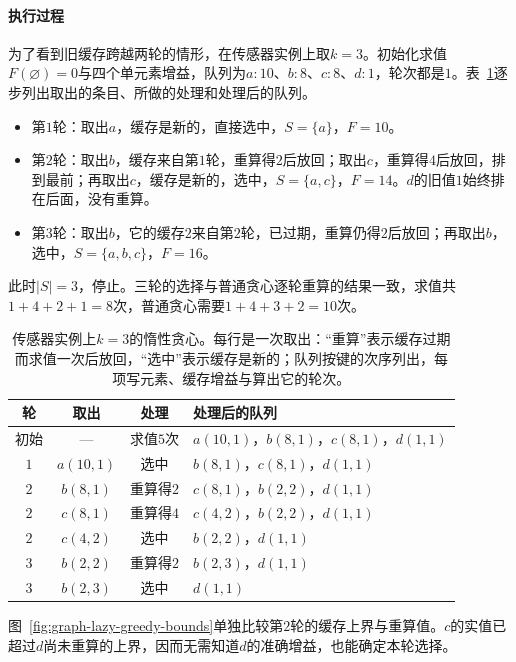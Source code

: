 \paragraph{执行过程}
为了看到旧缓存跨越两轮的情形，在传感器实例上取$k=3$。初始化求值$F(\varnothing)=0$与四个单元素增益，队列为$a{:}10$、$b{:}8$、$c{:}8$、$d{:}1$，轮次都是$1$。表~\ref{tab:graph-setfn-lazy-trace}逐步列出取出的条目、所做的处理和处理后的队列。
\begin{itemize}
  \item 第$1$轮：取出$a$，缓存是新的，直接选中，$S=\{a\}$，$F=10$。
  \item 第$2$轮：取出$b$，缓存来自第$1$轮，重算得$2$后放回；取出$c$，重算得$4$后放回，排到最前；再取出$c$，缓存是新的，选中，$S=\{a,c\}$，$F=14$。$d$的旧值$1$始终排在后面，没有重算。
  \item 第$3$轮：取出$b$，它的缓存$2$来自第$2$轮，已过期，重算仍得$2$后放回；再取出$b$，选中，$S=\{a,b,c\}$，$F=16$。
\end{itemize}
此时$|S|=3$，停止。三轮的选择与普通贪心逐轮重算的结果一致，求值共$1+4+2+1=8$次，普通贪心需要$1+4+3+2=10$次。

\begin{table}[!htb]
  \centering
  \small
  \begin{tabular}{@{}cccl@{}}
    \toprule
    轮 & 取出 & 处理 & 处理后的队列 \\
    \midrule
    初始 & — & 求值$5$次 & $a(10,1)$，$b(8,1)$，$c(8,1)$，$d(1,1)$ \\
    $1$ & $a(10,1)$ & 选中 & $b(8,1)$，$c(8,1)$，$d(1,1)$ \\
    $2$ & $b(8,1)$ & 重算得$2$ & $c(8,1)$，$b(2,2)$，$d(1,1)$ \\
    $2$ & $c(8,1)$ & 重算得$4$ & $c(4,2)$，$b(2,2)$，$d(1,1)$ \\
    $2$ & $c(4,2)$ & 选中 & $b(2,2)$，$d(1,1)$ \\
    $3$ & $b(2,2)$ & 重算得$2$ & $b(2,3)$，$d(1,1)$ \\
    $3$ & $b(2,3)$ & 选中 & $d(1,1)$ \\
    \bottomrule
  \end{tabular}
  \caption{传感器实例上$k=3$的惰性贪心。每行是一次取出：“重算”表示缓存过期而求值一次后放回，“选中”表示缓存是新的；队列按键的次序列出，每项写元素、缓存增益与算出它的轮次。}
  \label{tab:graph-setfn-lazy-trace}
\end{table}

图~\ref{fig:graph-lazy-greedy-bounds}单独比较第$2$轮的缓存上界与重算值。$c$的实值已超过$d$尚未重算的上界，因而无需知道$d$的准确增益，也能确定本轮选择。

